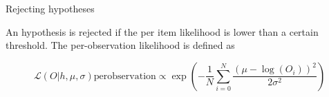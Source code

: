 Rejecting hypotheses

An hypothesis is rejected if the per item likelihood is lower than a certain threshold. The per-observation likelihood is defined as

\begin{equation}
\label{eq:per_obs_likelihood}
\mathcal{L}(O|h, \mu, \sigma) \mathrm{ per observation } \propto \exp\left(-\frac{1}{N}\sum_{i=0}^N \frac{(\mu - \log(O_i))^2}{2\sigma^2}\right)
\end{equation}





